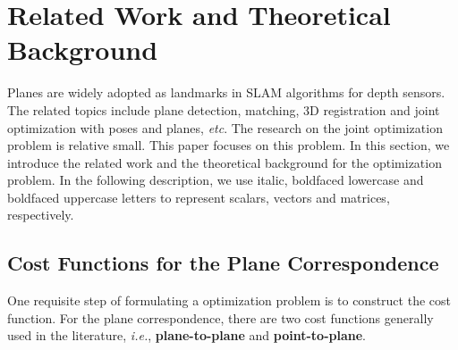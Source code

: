 \documentclass{vgtc}                          %
\begin{document}
\section{Related Work and Theoretical Background} \label{sect_related-work}
Planes are widely adopted as landmarks  in  SLAM algorithms for depth sensors. The related topics include plane detection,  matching,   3D registration  and joint optimization with poses and planes, \textit{etc}. %
The research on the joint optimization problem is relative small. This paper  focuses on this problem. In this section, we introduce the related work and the theoretical background for the  optimization problem. In the following description, we use italic, boldfaced lowercase and boldfaced uppercase letters to represent scalars, vectors and matrices, respectively.


\subsection{Cost Functions for the Plane Correspondence}
One requisite  step  of formulating a optimization problem is to construct the cost function. For the plane correspondence, there are two cost functions generally used in the literature, \textit{i.e.}, \textbf{plane-to-plane }and \textbf{point-to-plane}. 
\end{document}
